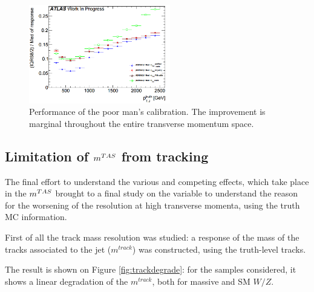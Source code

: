 \begin{figure}[!ht]
  \centering
      \includegraphics[width=0.55\textwidth]{jet_part/calib/perfectcalib4.png}
  \caption[Simple calibration]{Performance of the poor man's calibration. The improvement is marginal throughout the entire transverse momentum space.}
  \label{fig:perfcalib4}
\end{figure}

\subsection{Limitation of $m^{TAS}$ from tracking}
The final effort to understand the various and competing effects, which take place in the $m^{TAS}$ brought to a final study on the variable to understand the reason for the worsening of the resolution at high transverse momenta, using the truth MC information.

First of all the track mass resolution was studied: a response of the mass of the tracks associated to the jet ($m^{track}$) was constructed, using the truth-level tracks.

The result is shown on Figure \ref{fig:trackdegrade}: for the samples considered, it shows a linear degradation of the $m^{track}$, both for massive and SM $W/Z$.

